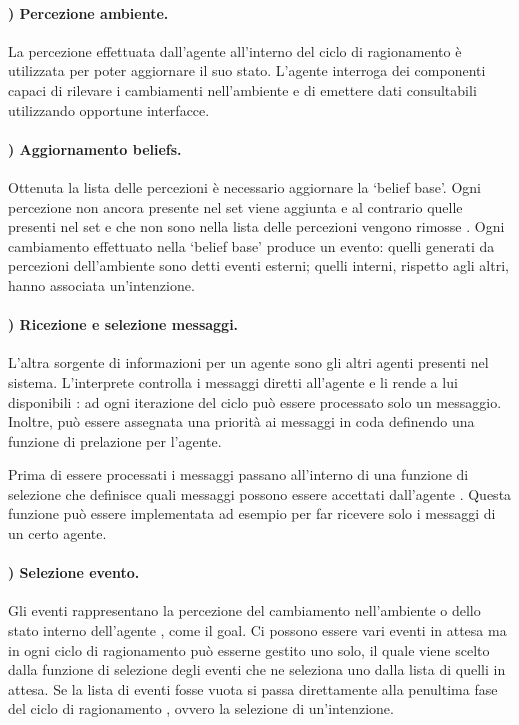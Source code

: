 \setcounter{reasoningCycleCounter}{0}

\paragraph{) Percezione ambiente.}
La percezione effettuata dall'agente all'interno del ciclo di ragionamento è utilizzata per poter aggiornare il suo stato. L'agente interroga dei componenti capaci di rilevare i cambiamenti nell'ambiente \cite{JasonAgentSpeak} e di emettere dati consultabili utilizzando opportune interfacce.

\paragraph{) Aggiornamento beliefs.}
Ottenuta la lista delle percezioni è necessario aggiornare la `belief base'. Ogni percezione non ancora presente nel set viene aggiunta e al contrario quelle presenti nel set e che non sono nella lista delle percezioni vengono rimosse \cite{JasonAgentSpeak}.
Ogni cambiamento effettuato nella `belief base' produce un evento: quelli generati da percezioni dell'ambiente sono detti eventi esterni; quelli interni, rispetto agli altri, hanno associata un'intenzione.

\paragraph{) Ricezione e selezione messaggi.}
L'altra sorgente di informazioni per un agente sono gli altri agenti presenti nel sistema. L'interprete controlla i messaggi diretti all'agente e li rende a lui disponibili \cite{JasonAgentSpeak}: ad ogni iterazione del ciclo può essere processato solo un messaggio. Inoltre, può essere assegnata una priorità ai messaggi in coda definendo una funzione di prelazione per l'agente.

Prima di essere processati i messaggi passano all'interno di una funzione di selezione che definisce quali messaggi possono essere accettati dall'agente \cite{JasonAgentSpeak}. Questa funzione può essere implementata ad esempio per far ricevere solo i messaggi di un certo agente.

\paragraph{) Selezione evento.}
Gli eventi rappresentano la percezione del cambiamento nell'ambiente o dello stato interno dell'agente \cite{JasonAgentSpeak}, come il goal. Ci possono essere vari eventi in attesa ma in ogni ciclo di ragionamento può esserne gestito uno solo, il quale viene scelto dalla funzione di selezione degli eventi che ne seleziona uno dalla lista di quelli in attesa. Se la lista di eventi fosse vuota si passa direttamente alla penultima fase del ciclo di ragionamento \cite{JasonAgentSpeak}, ovvero la selezione di un'intenzione.

